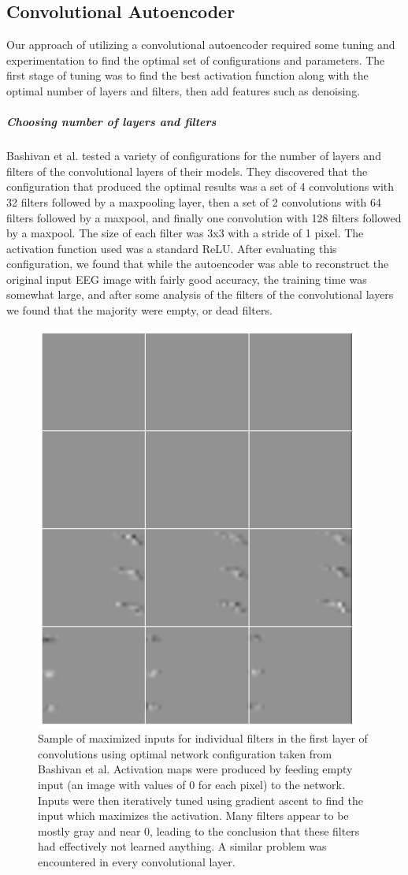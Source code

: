 \documentclass{article}
\begin{document}
\subsection{Convolutional Autoencoder}
Our approach of utilizing a convolutional autoencoder required some tuning and experimentation to find the optimal set of configurations and parameters. The first stage of tuning was to find the best activation function along with the optimal number of layers and filters, then add features such as denoising.
\subparagraph{Choosing number of layers and filters}
Bashivan et al. tested a variety of configurations for the number of layers and filters of the convolutional layers of their models. They discovered that the configuration that produced the optimal results was a set of 4 convolutions with 32 filters followed by a maxpooling layer, then a set of 2 convolutions with 64 filters followed by a maxpool, and finally one convolution with 128 filters followed by a maxpool. The size of each filter was 3x3 with a stride of 1 pixel. The activation function used was a standard ReLU. After evaluating this configuration, we found that while the autoencoder was able to reconstruct the original input EEG image with fairly good accuracy, the training time was somewhat large, and after some analysis of the filters of the convolutional layers we found that the majority were empty, or dead filters.
\begin{figure}[!ht]
	\centering
    \includegraphics[scale=0.6]{inputs_orig}
    \caption{Sample of maximized inputs for individual filters in the first layer of convolutions using optimal network configuration taken from Bashivan et al. Activation maps were produced by feeding empty input (an image with values of 0 for each pixel) to the network. Inputs were then iteratively tuned using gradient ascent to find the input which maximizes the activation. Many filters appear to be mostly gray and near 0, leading to the conclusion that these filters had effectively not learned anything. A similar problem was encountered in every convolutional layer.}
\end{figure}
\end{document}
